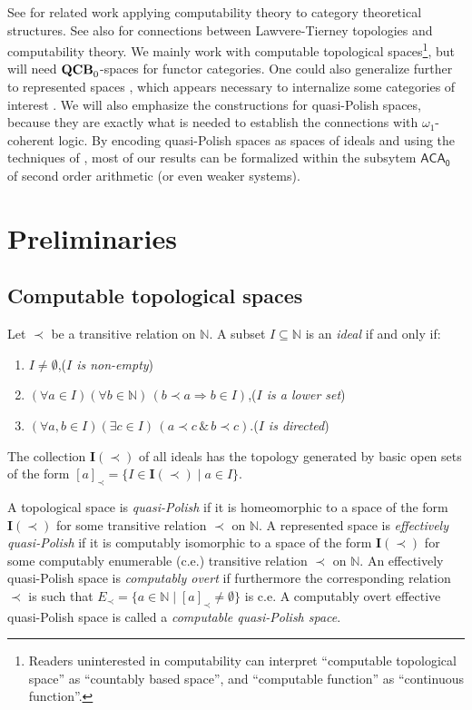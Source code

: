 \documentclass[envcountsame]{llncs}
\def\QCB{{{\bf QCB}_0}}
\def\IN{{\mathbb N}}
\def\I#1{{{\mathrm{\mathbf I}}(#1)}}
\newcommand{\ACA}{\mathsf{ACA_0}}
\def\QCB{{{\bf QCB}_0}}
\begin{document}
See \cite{HMMM17,MPSS18,dbr21b,FNPPV25} for related work applying computability theory to category theoretical structures. See also \cite{K23} for connections between Lawvere-Tierney topologies and computability theory. We mainly work with computable topological spaces\footnote{Readers uninterested in computability can interpret ``computable topological space'' as ``countably based space'', and ``computable function'' as ``continuous function''.}, but will need $\QCB$-spaces \cite{Sch21} for functor categories. One could also generalize further to represented spaces \cite{P16}, which appears necessary to internalize some categories of interest \cite{dbr21b}. We will also emphasize the constructions for quasi-Polish spaces, because they are exactly what is needed to establish the connections with $\omega_1$-coherent logic. By encoding quasi-Polish spaces as spaces of ideals and using the techniques of \cite{mummert:phd}, most of our results can be formalized within the subsytem $\ACA$ of second order arithmetic (or even weaker systems). 



\section{Preliminaries}

\subsection{Computable topological spaces}

Let $\prec$ be a transitive relation on $\IN$. A subset $I\subseteq \IN$ is an \emph{ideal} if and only if:
\begin{enumerate}
\item
$I \not=\emptyset$,\hfill (\emph{$I$ is non-empty})
\item
$(\forall a \in I) (\forall b \in \IN)\, (b \prec a \Rightarrow b \in I)$,\hfill (\emph{$I$ is a lower set})
\item
$(\forall a,b \in I)(\exists c\in I)\, (a \prec c  \,\&\,  b \prec c)$.\hfill (\emph{$I$ is directed})
\end{enumerate}
The collection $\I{\prec}$ of all ideals has the topology generated by basic open sets of the form $[a]_{\prec} = \{ I \in \I{\prec} \mid a \in I\}$.

A topological space is \emph{quasi-Polish} if it is homeomorphic to a space of the form $\I{\prec}$ for some transitive relation $\prec$ on $\IN$. A represented space is \emph{effectively quasi-Polish} if it is computably isomorphic to a space of the form $\I{\prec}$ for some computably enumerable (c.e.) transitive relation $\prec$ on $\IN$. An effectively quasi-Polish space is \emph{computably overt} if furthermore the corresponding relation $\prec$ is such that $E_\prec=\{ a\in\IN \mid [a]_\prec\not=\emptyset\}$ is c.e. A computably overt effective quasi-Polish space is called a \emph{computable quasi-Polish space}.
 
\end{document}
